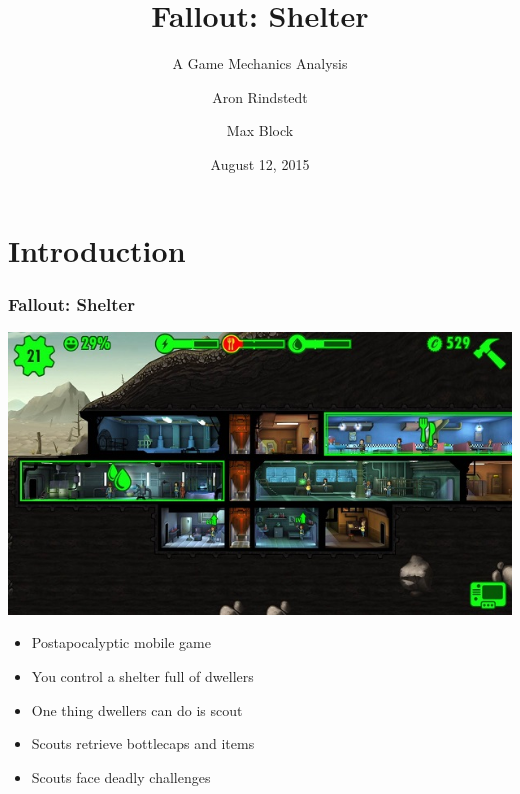 \documentclass{beamer}
\title{Fallout: Shelter}
\subtitle{A Game Mechanics Analysis}
\author{Aron Rindstedt \and Max Block}
\date{August 12, 2015}
\begin{document}
\maketitle

\section{Introduction}
\begin{frame}
  \frametitle{Fallout: Shelter}
  \centering
  \includegraphics[scale=.3]{Fallout_Shelter_gameplay}
  \begin{itemize}
  \item Postapocalyptic mobile game
  \item You control a shelter full of dwellers
  \item One thing dwellers can do is scout
  \item Scouts retrieve bottlecaps and items
  \item Scouts face deadly challenges
  \end{itemize}
\end{frame}
\end{document}

